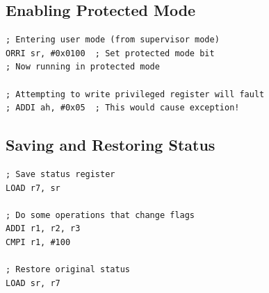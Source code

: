 \subsection{Enabling Protected Mode}

\begin{lstlisting}
; Entering user mode (from supervisor mode)
ORRI sr, #0x0100  ; Set protected mode bit
; Now running in protected mode

; Attempting to write privileged register will fault
; ADDI ah, #0x05  ; This would cause exception!
\end{lstlisting}

\subsection{Saving and Restoring Status}

\begin{lstlisting}
; Save status register
LOAD r7, sr

; Do some operations that change flags
ADDI r1, r2, r3
CMPI r1, #100

; Restore original status
LOAD sr, r7
\end{lstlisting}
